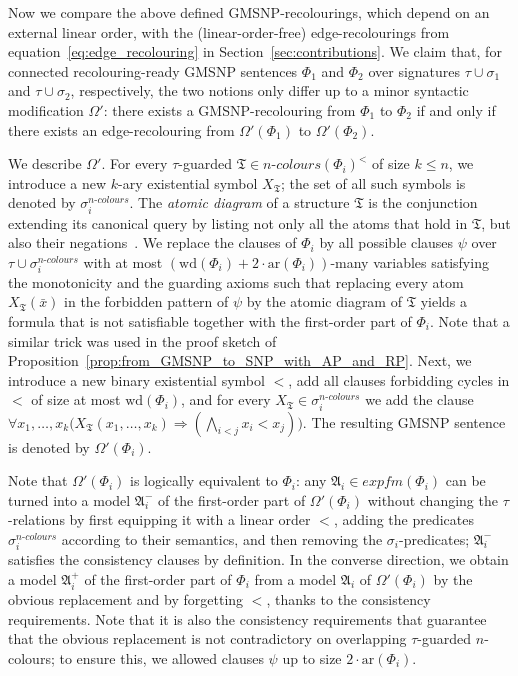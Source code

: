 \documentclass[oneside,reqno,12pt]{amsart}
\theoremstyle{plain}
\theoremstyle{remark}
\newcommand{\struct}[1]{\mathfrak{#1}}
\newcommand{\efm}{\ensuremath{\mathit{expfm}}\xspace}
\newcommand{\colours}{\ensuremath{n\text{-}\mathit{colours}}}
\newcommand{\wh}{\ensuremath{\mathrm{wd}}\xspace}
\newcommand{\ar}{\ensuremath{\mathrm{ar}}\xspace}
\begin{document}
{  Now we compare the above defined GMSNP-recolourings, which depend on an external linear order, with the (linear-order-free) edge-recolourings from equation~\eqref{eq:edge_recolouring} in Section~\ref{sec:contributions}. 
We claim that, for connected recolouring-ready GMSNP sentences $\Phi_1$ and $\Phi_2$ over signatures $\tau\cup \sigma_1$ and $\tau\cup \sigma_2$, respectively, the two notions only differ up to a minor syntactic modification $\Omega'$: there exists a GMSNP-recolouring from $\Phi_1$ to $\Phi_2$ if and only if there exists an edge-recolouring from $\Omega'(\Phi_1)$ to $\Omega'(\Phi_2)$. 

We describe $\Omega'$. For every $\tau$-guarded $\struct{T}\in \colours(\Phi_i)^{<}$ of size $k\leq n$, we introduce a new $k$-ary existential symbol $X_{\struct{T}}$; the set of all such symbols is denoted by $\sigma_i^{\textit{n-colours}}$. The \emph{atomic diagram} of a structure $\struct{T}$ is the conjunction  extending  its canonical query by listing not only all the atoms that hold in $\struct{T}$, but also their negations~\cite{hodges_book}.
We replace the clauses of $\Phi_i$ by all possible clauses $\psi$ over $\tau\cup \sigma_i^{\textit{n-colours}}$ with at most $(\wh(\Phi_i)+2\cdot \ar(\Phi_i))$-many variables satisfying the monotonicity and the guarding axioms such that replacing every atom $X_{\struct{T}}(\bar{x})$ in the forbidden pattern of $\psi$ by the atomic diagram of $\struct{T}$ yields a formula that is not satisfiable together with the first-order part of $\Phi_i$.  
Note that a similar trick was used in the proof sketch of Proposition~\ref{prop:from_GMSNP_to_SNP_with_AP_and_RP}. Next, we introduce a new binary existential symbol $<$, add all clauses forbidding cycles in $<$ of size at most $\wh(\Phi_i)$, and for every $X_{\struct{T}}\in\sigma_i^{\textit{n-colours}}$ 
we add the clause $
    \forall x_1,\dots, x_k \big( X_{\struct{T}}(x_1,\dots,x_k) \Rightarrow   (\bigwedge\nolimits_{i<j} x_i<x_j)    \big). $ 
The resulting GMSNP sentence is denoted by  $\Omega'(\Phi_i)$. 

Note that  $\Omega'(\Phi_i)$ is logically equivalent to $\Phi_i$: any  $\struct A_i\in \efm{(\Phi_i)}$ can be turned into a model $\struct A_i^-$ of the first-order part of  $\Omega'(\Phi_i)$ without changing the $\tau$-relations by first equipping it with a linear order $<$, adding the predicates $\sigma_i^{\textit{n-colours}}$ according to their semantics, and then removing the $\sigma_i$-predicates; $\struct A_i^-$   satisfies the consistency clauses by definition. In the converse direction, we obtain a model $\struct A_i^+$ of the first-order part of $\Phi_i$ from a model $\struct A_i$ of  $\Omega'(\Phi_i)$ by the obvious replacement and by forgetting $<$, thanks to the consistency requirements. Note that it is also the consistency requirements that guarantee that the obvious replacement is not contradictory on overlapping $\tau$-guarded $n$-colours; to ensure this, we allowed clauses $\psi$ up to size $2\cdot \ar(\Phi_i)$. 


}
\end{document}
